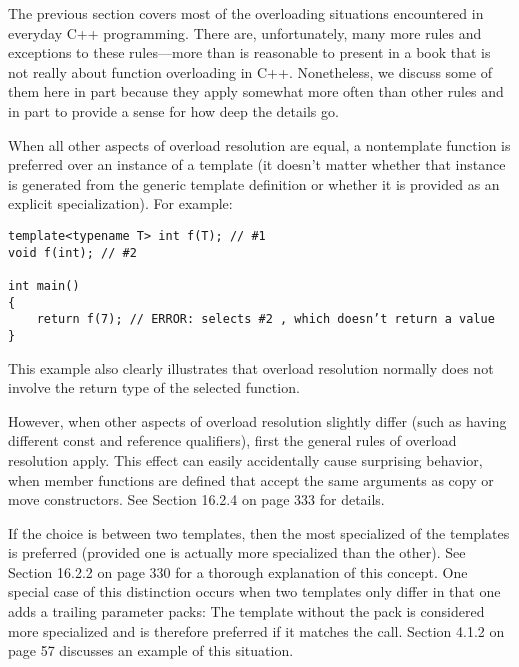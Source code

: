 
The previous section covers most of the overloading situations encountered in everyday C++ programming. There are, unfortunately, many more rules and exceptions to these rules—more than is reasonable to present in a book that is not really about function overloading in C++. Nonetheless, we discuss some of them here in part because they apply somewhat more often than other rules and in part to provide a sense for how deep the details go.


When all other aspects of overload resolution are equal, a nontemplate function is preferred over an instance of a template (it doesn’t matter whether that instance is generated from the generic template definition or whether it is provided as an explicit specialization). For example:

\begin{lstlisting}[style=styleCXX]
template<typename T> int f(T); // #1
void f(int); // #2

int main()
{
	return f(7); // ERROR: selects #2 , which doesn’t return a value
}
\end{lstlisting}

This example also clearly illustrates that overload resolution normally does not involve the return type of the selected function. 

However, when other aspects of overload resolution slightly differ (such as having different const and reference qualifiers), first the general rules of overload resolution apply. This effect can easily accidentally cause surprising behavior, when member functions are defined that accept the same arguments as copy or move constructors. See Section 16.2.4 on page 333 for details.

If the choice is between two templates, then the most specialized of the templates is preferred (provided one is actually more specialized than the other). See Section 16.2.2 on page 330 for a thorough explanation of this concept. One special case of this distinction occurs when two templates only differ in that one adds a trailing parameter packs: The template without the pack is considered more specialized and is therefore preferred if it matches the call. Section 4.1.2 on page 57 discusses an example of this situation.



